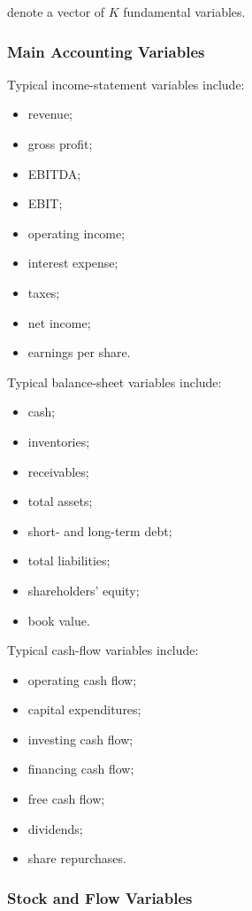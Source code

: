 \documentclass[11pt,a4paper]{article}
\begin{document}
denote a vector of $K$ fundamental variables.


\subsubsection{Main Accounting Variables}

Typical income-statement variables include:

\begin{itemize}
    \item revenue;
    \item gross profit;
    \item EBITDA;
    \item EBIT;
    \item operating income;
    \item interest expense;
    \item taxes;
    \item net income;
    \item earnings per share.
\end{itemize}

Typical balance-sheet variables include:

\begin{itemize}
    \item cash;
    \item inventories;
    \item receivables;
    \item total assets;
    \item short- and long-term debt;
    \item total liabilities;
    \item shareholders' equity;
    \item book value.
\end{itemize}

Typical cash-flow variables include:

\begin{itemize}
    \item operating cash flow;
    \item capital expenditures;
    \item investing cash flow;
    \item financing cash flow;
    \item free cash flow;
    \item dividends;
    \item share repurchases.
\end{itemize}


\subsubsection{Stock and Flow Variables}
\end{document}

